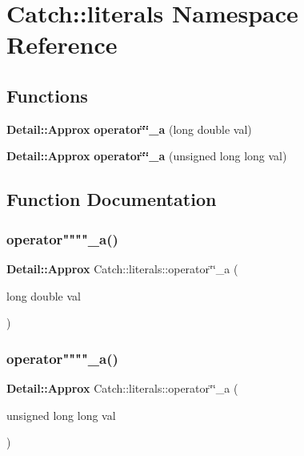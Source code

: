 \section{Catch\+::literals Namespace Reference}
\label{namespace_catch_1_1literals}
\subsection*{Functions}
\begin{DoxyCompactItemize}
\item 
\textbf{ Detail\+::\+Approx} \textbf{ operator\char`\"{}\char`\"{}\+\_\+a} (long double val)
\item 
\textbf{ Detail\+::\+Approx} \textbf{ operator\char`\"{}\char`\"{}\+\_\+a} (unsigned long long val)
\end{DoxyCompactItemize}


\subsection{Function Documentation}
\mbox{\label{namespace_catch_1_1literals_aed9bf4d544c60a074440a055a54ea6c3}} 
\subsubsection{operator""""\_a()\hspace{0.1cm}{\footnotesize\ttfamily [1/2]}}
{\footnotesize\ttfamily \textbf{ Detail\+::\+Approx} Catch\+::literals\+::operator\char`\"{}\char`\"{}\+\_\+a (\begin{DoxyParamCaption}\item[{long double}]{val }\end{DoxyParamCaption})}

\mbox{\label{namespace_catch_1_1literals_aded81112b3a271a8b9538dff17acd093}} 
\subsubsection{operator""""\_a()\hspace{0.1cm}{\footnotesize\ttfamily [2/2]}}
{\footnotesize\ttfamily \textbf{ Detail\+::\+Approx} Catch\+::literals\+::operator\char`\"{}\char`\"{}\+\_\+a (\begin{DoxyParamCaption}\item[{unsigned long long}]{val }\end{DoxyParamCaption})}

